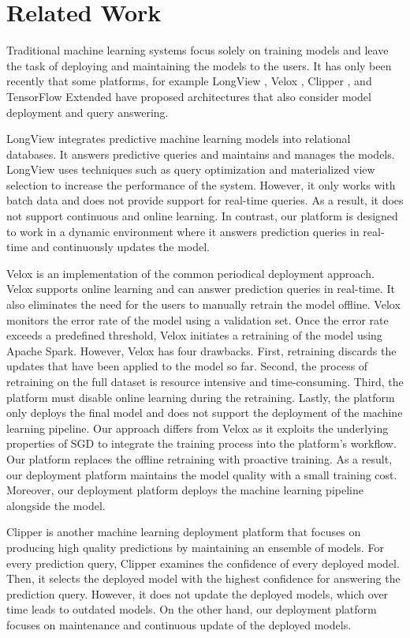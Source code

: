 \section{Related Work} \label{related-work}
Traditional machine learning systems focus solely on training models and leave the task of deploying and maintaining the models to the users.
It has only been recently that some platforms, for example LongView \cite{akdere2011case}, Velox \cite{crankshaw2014missing}, Clipper \cite{crankshaw2016clipper} , and TensorFlow Extended \cite{baylor2017tfx} have proposed architectures that also consider model deployment and query answering.

LongView integrates predictive machine learning models into relational databases. 
It answers predictive queries and maintains and manages the models.
LongView uses techniques such as query optimization and materialized view selection to increase the performance of the system.
However, it only works with batch data and does not provide support for real-time queries. 
As a result, it does not support continuous and online learning.
In contrast, our platform is designed to work in a dynamic environment where it answers prediction queries in real-time and continuously updates the model.

Velox is an implementation of the common periodical deployment approach.
Velox supports online learning and can answer prediction queries in real-time.
It also eliminates the need for the users to manually retrain the model offline.
Velox monitors the error rate of the model using a validation set.
Once the error rate exceeds a predefined threshold, Velox initiates a retraining of the model using Apache Spark. 
However, Velox has four drawbacks.
First, retraining discards the updates that have been applied to the model so far.
Second, the process of retraining on the full dataset is resource intensive and time-consuming.
Third, the platform must disable online learning during the retraining.
Lastly, the platform only deploys the final model and does not support the deployment of the machine learning pipeline.
Our approach differs from Velox as it exploits the underlying properties of SGD to integrate the training process into the platform's workflow.
Our platform replaces the offline retraining with proactive training.
As a result, our deployment platform maintains the model quality with a small training cost.
Moreover, our deployment platform deploys the machine learning pipeline alongside the model.

Clipper is another machine learning deployment platform that focuses on producing high quality predictions by maintaining an ensemble of models.
For every prediction query, Clipper examines the confidence of every deployed model.
Then, it selects the deployed model with the highest confidence for answering the prediction query.
However, it does not update the deployed models, which over time leads to outdated models.
On the other hand, our deployment platform focuses on maintenance and continuous update of the deployed models.

